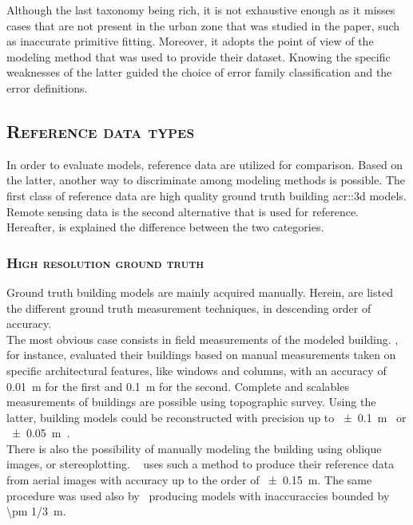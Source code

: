             Although the last taxonomy being rich, it is not exhaustive enough as it misses cases that are not present in the urban zone that was studied in the paper, such as inaccurate primitive fitting.
            Moreover, it adopts the point of view of the modeling method that was used to provide their dataset.
            Knowing the specific weaknesses of the latter guided the choice of error family classification and the error definitions.

    \subsection{\textsc{Reference data types}}
        \label{subsec::state_of_the_art::quality::reference}
        In order to evaluate models, reference data are utilized for comparison.
        Based on the latter, another way to discriminate among modeling methods is possible.
        The first class of reference data are high quality ground truth building \gls{acr::3d} models.
        Remote sensing data is the second alternative that is used for reference.
        Hereafter, is explained the difference between the two categories.

        \subsubsection{\textsc{High resolution ground truth}}
            Ground truth building models are mainly acquired manually.
            Herein, are listed the different ground truth measurement techniques, in descending order of accuracy.\\

            The most obvious case consists in field measurements of the modeled building.
            \textcite{dick2004modelling}, for instance, evaluated their buildings based on manual measurements taken on specific architectural features, like windows and columns, with an accuracy of \SI{0.01}{\m} for the first and \SI{0.1}{\m} for the second.
            Complete and scalables measurements of buildings are possible using topographic survey.
            Using the latter, building models could be reconstructed with precision up to \SI{\pm 0.1}{\m}~\parencite{henricsson19973} or \SI{\pm 0.05}{\m}~\parencite{vogtle2003quality}.\\
            There is also the possibility of manually modeling the building using oblique images, or stereoplotting.
            ~\textcite{zebedin2008fusion} uses such a method to produce their reference data from aerial images with accuracy up to the order of \SI{\pm 0.15}{\m}.
            The same procedure was used also by~\textcite{jaynes2003recognition} producing models with inaccuraccies bounded by \SI{\pm 1/3}{\m}.

